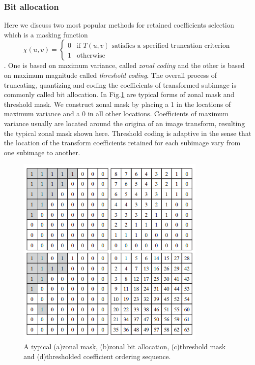 \subsubsection{Bit allocation}
Here we discuss two most popular methods for retained coefficients selection which is a masking function 
\begin{equation}\chi(u,v)= \left\{ \begin{array}{rcl}
0 & \text{if $T(u,v)$ satisfies a specified truncation criterion}\\
1 & \text{otherwise}
\end{array} \right. \end{equation}. One is based on maximum variance, called \emph{zonal coding} and the other is based on maximum magnitude called \emph{threshold coding}. The overall process of truncating, quantizing and coding the coefficients of transformed subimage is commonly called bit allocation. In Fig.\ref{fig:bitalloc} are typical forms of zonal mask and threshold mask. We construct zonal mask by placing a 1 in the locations of maximum variance and a 0 in all other locations. Coefficients of maximum variance usually are located around the origina of an image transform, resulting the typical zonal mask shown here. Threshold coding is adaptive in the sense that the location of the transform coefficients retained for each subimage vary from one subimage to another.\\
\begin{figure}[h!]
	\centering	
	\includegraphics[width=0.7\linewidth]{myfigure/p7/bit_allocation.png}
	\caption{A typical (a)zonal mask, (b)zonal bit allocation, (c)threshold mask and (d)thresholded coefficient ordering sequence.}
	\label{fig:bitalloc}
\end{figure}

\subsubsection{}




